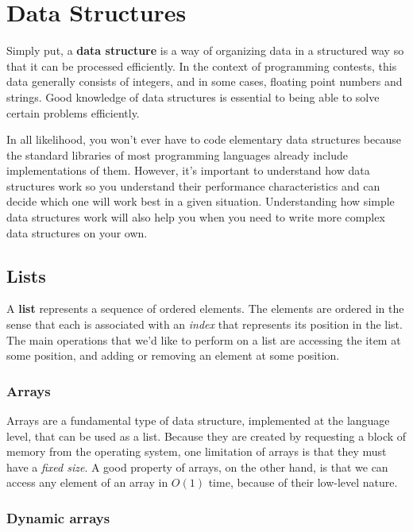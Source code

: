 \chapter{Data Structures}

Simply put, a \textbf{data structure} is a way of organizing data in a structured way so that it can be processed efficiently. In the context of programming contests, this data generally consists of integers, and in some cases, floating point numbers and strings. Good knowledge of data structures is essential to being able to solve certain problems efficiently.

In all likelihood, you won't ever have to code elementary data structures because the standard libraries of most programming languages already include implementations of them. However, it's important to understand how data structures work so you understand their performance characteristics and can decide which one will work best in a given situation. Understanding how simple data structures work will also help you when you need to write more complex data structures on your own.



\section{Lists}

A \textbf{list} represents a sequence of ordered elements. The elements are ordered in the sense that each is associated with an \textit{index} that represents its position in the list. The main operations that we'd like to perform on a list are accessing the item at some position, and adding or removing an element at some position.


\subsection{Arrays}

Arrays are a fundamental type of data structure, implemented at the language level, that can be used as a list. Because they are created by requesting a block of memory from the operating system, one limitation of arrays is that they must have a \textit{fixed size}. A good property of arrays, on the other hand, is that we can access any element of an array in $O(1)$ time, because of their low-level nature.

\subsection{Dynamic arrays} \label{sec:dynamic-array}


